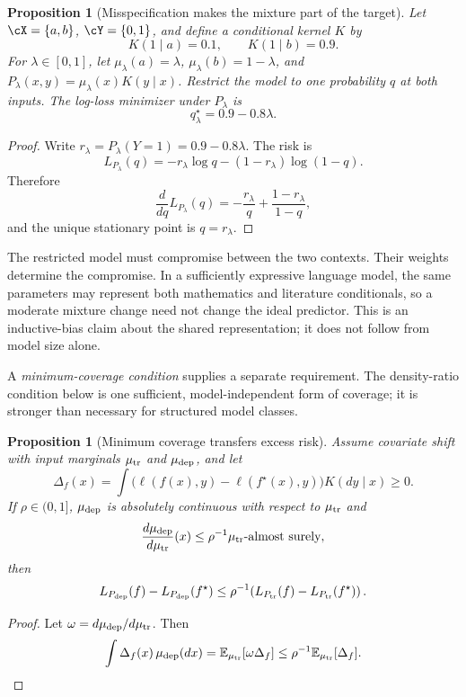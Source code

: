 \documentclass[11pt,twoside]{article}
\newcommand{\E}{\mathbb E}
\newtheorem{proposition}[theorem]{Proposition}
\theoremstyle{definition}
\theoremstyle{remark}
\begin{document}
\begin{proposition}[Misspecification makes the mixture part of the target]
\label{prop:misspecified-mixture}
Let $\cX=\{a,b\}$, $\cY=\{0,1\}$, and define a conditional kernel $K$ by
\[
K(1\mid a)=0.1,
\qquad
K(1\mid b)=0.9.
\]
For $\lambda\in[0,1]$, let $\mu_\lambda(a)=\lambda$,
$\mu_\lambda(b)=1-\lambda$, and
$P_\lambda(x,y)=\mu_\lambda(x)K(y\mid x)$. Restrict the model to one
probability $q$ at both inputs. The log-loss minimizer under $P_\lambda$ is
\[
q_\lambda^\star=0.9-0.8\lambda.
\]
\end{proposition}

\begin{proof}
Write $r_\lambda=P_\lambda(Y=1)=0.9-0.8\lambda$. The risk is
\[
L_{P_\lambda}(q)
=-r_\lambda\log q-(1-r_\lambda)\log(1-q).
\]
Therefore
\[
\frac{d}{dq}L_{P_\lambda}(q)
=-\frac{r_\lambda}{q}+\frac{1-r_\lambda}{1-q},
\]
and the unique stationary point is $q=r_\lambda$.
\end{proof}

The restricted model must compromise between the two contexts. Their weights
determine the compromise. In a sufficiently expressive language model, the
same parameters may represent both mathematics and literature conditionals,
so a moderate mixture change need not change the ideal predictor. This is an
inductive-bias claim about the shared representation; it does not follow from
model size alone.

A \emph{minimum-coverage condition} supplies a separate requirement. The
density-ratio condition below is one sufficient, model-independent form of
coverage; it is stronger than necessary for structured model classes.

\begin{proposition}[Minimum coverage transfers excess risk]
\label{prop:coverage}
Assume covariate shift with input marginals $\mu_{\rm tr}$ and
$\mu_{\rm dep}$, and let
\[
\Delta_f(x)=
\int\bigl(\ell(f(x),y)-\ell(f^\star(x),y)\bigr)K(dy\mid x)\ge0.
\]
If $\rho\in(0,1]$, $\mu_{\rm dep}$ is absolutely continuous with respect to
$\mu_{\rm tr}$ and
\[
\frac{d\mu_{\rm dep}}{d\mu_{\rm tr}}(x)\le\rho^{-1}
\quad \mu_{\rm tr}\text{-almost surely},
\]
then
\begin{equation}
L_{P_{\rm dep}}(f)-L_{P_{\rm dep}}(f^\star)
\le
\rho^{-1}\!\left(
L_{P_{\rm tr}}(f)-L_{P_{\rm tr}}(f^\star)
\right).
\label{eq:coverage-transfer}
\end{equation}
\end{proposition}

\begin{proof}
Let $\omega=d\mu_{\rm dep}/d\mu_{\rm tr}$. Then
\[
\int\Delta_f(x)\,\mu_{\rm dep}(dx)
=\E_{\mu_{\rm tr}}[\omega\Delta_f]
\le\rho^{-1}\E_{\mu_{\rm tr}}[\Delta_f].
\]
\end{proof}
\end{document}
